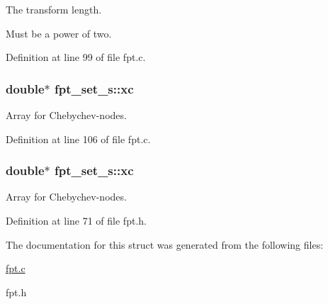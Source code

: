 The transform length. 

Must be a power of two. 

Definition at line 99 of file fpt.c.\hypertarget{structfpt__set__s_b84648e5abdffa255d8b77e4fb19a3c4}{
\subsubsection{\setlength{\rightskip}{0pt plus 5cm}double$\ast$ {\bf fpt\_\-set\_\-s::xc}}}
\label{structfpt__set__s_b84648e5abdffa255d8b77e4fb19a3c4}


Array for Chebychev-nodes. 



Definition at line 106 of file fpt.c.\hypertarget{structfpt__set__s_b84648e5abdffa255d8b77e4fb19a3c4}{
\subsubsection{\setlength{\rightskip}{0pt plus 5cm}double$\ast$ {\bf fpt\_\-set\_\-s::xc}}}
\label{structfpt__set__s_b84648e5abdffa255d8b77e4fb19a3c4}


Array for Chebychev-nodes. 



Definition at line 71 of file fpt.h.

The documentation for this struct was generated from the following files:\begin{CompactItemize}
\item 
\hyperlink{fpt_8c}{fpt.c}\item 
fpt.h\end{CompactItemize}
